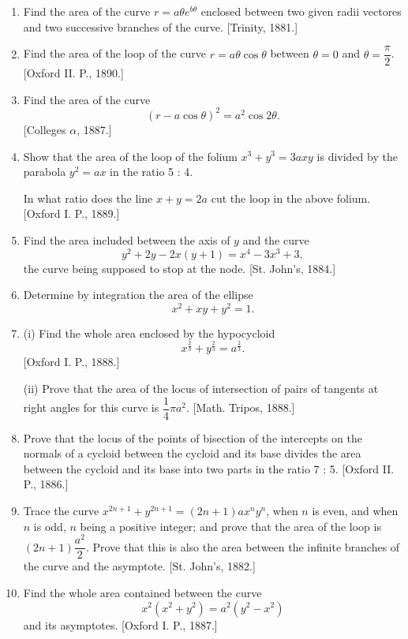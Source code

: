 \documentclass[11pt, a4paper]{article}
\newcommand{\source}[1]{\hfill\textnormal{[#1]}}
\begin{document}
\begin{enumerate}[leftmargin=2em]
\item Find the area of the curve $r=a\theta e^{b\theta}$ enclosed between two given radii vectores and two successive branches of the curve. \source{Trinity, 1881.}

\item Find the area of the loop of the curve $r=a\theta\cos\theta$ between $\theta=0$ and $\theta=\dfrac{\pi}{2}$. \source{Oxford II. P., 1890.}

\item Find the area of the curve
\[
(r-a\cos\theta)^2=a^2\cos2\theta.
\]
\source{Colleges $\alpha$, 1887.}

\item Show that the area of the loop of the folium $x^3+y^3=3axy$ is divided by the parabola $y^2=ax$ in the ratio 5 : 4.

In what ratio does the line $x+y=2a$ cut the loop in the above folium. \source{Oxford I. P., 1889.}

\item Find the area included between the axis of $y$ and the curve
\[
y^2+2y-2x(y+1)=x^4-3x^3+3,
\]
the curve being supposed to stop at the node. \source{St. John's, 1884.}

\item Determine by integration the area of the ellipse
\[
x^2+xy+y^2=1.
\]

\item (i) Find the whole area enclosed by the hypocycloid
\[
x^{\frac23}+y^{\frac23}=a^{\frac23}.
\]
\source{Oxford I. P., 1888.}

(ii) Prove that the area of the locus of intersection of pairs of tangents at right angles for this curve is $\dfrac14\pi a^2$. \source{Math. Tripos, 1888.}

\item Prove that the locus of the points of bisection of the intercepts on the normals of a cycloid between the cycloid and its base divides the area between the cycloid and its base into two parts in the ratio 7 : 5. \source{Oxford II. P., 1886.}

\item Trace the curve $x^{2n+1}+y^{2n+1}=(2n+1)ax^ny^n$, when $n$ is even, and when $n$ is odd, $n$ being a positive integer; and prove that the area of the loop is $(2n+1)\dfrac{a^2}{2}$. Prove that this is also the area between the infinite branches of the curve and the asymptote. \source{St. John's, 1882.}

\item Find the whole area contained between the curve
\[
x^2(x^2+y^2)=a^2(y^2-x^2)
\]
and its asymptotes. \source{Oxford I. P., 1887.}


\end{enumerate}
\end{document}
